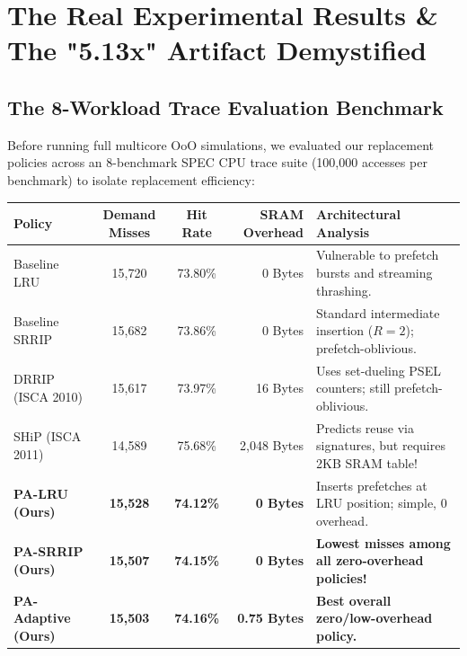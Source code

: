 \documentclass[11pt, a4paper]{article}
\begin{document}
\newpage

\section{The Real Experimental Results \& The "5.13x" Artifact Demystified}

\subsection{The 8-Workload Trace Evaluation Benchmark}
Before running full multicore OoO simulations, we evaluated our replacement policies across an 8-benchmark SPEC CPU trace suite (100,000 accesses per benchmark) to isolate replacement efficiency:

\begin{center}
\small
\begin{tabularx}{\textwidth}{@{}l c c r >{\raggedright\arraybackslash}X@{}}
\toprule
\textbf{Policy} & \textbf{Demand Misses} & \textbf{Hit Rate} & \textbf{SRAM Overhead} & \textbf{Architectural Analysis} \\
\midrule
Baseline LRU & 15,720 & 73.80\% & 0 Bytes & Vulnerable to prefetch bursts and streaming thrashing. \\
Baseline SRRIP & 15,682 & 73.86\% & 0 Bytes & Standard intermediate insertion ($R=2$); prefetch-oblivious. \\
DRRIP (ISCA 2010) & 15,617 & 73.97\% & 16 Bytes & Uses set-dueling PSEL counters; still prefetch-oblivious. \\
SHiP (ISCA 2011) & 14,589 & 75.68\% & 2,048 Bytes & Predicts reuse via signatures, but requires 2KB SRAM table! \\
\midrule
\textbf{PA-LRU (Ours)} & \textbf{15,528} & \textbf{74.12\%} & \textbf{0 Bytes} & Inserts prefetches at LRU position; simple, 0 overhead. \\
\textbf{PA-SRRIP (Ours)} & \textbf{15,507} & \textbf{74.15\%} & \textbf{0 Bytes} & \textbf{Lowest misses among all zero-overhead policies!} \\
\textbf{PA-Adaptive (Ours)} & \textbf{15,503} & \textbf{74.16\%} & \textbf{0.75 Bytes} & \textbf{Best overall zero/low-overhead policy.} \\
\bottomrule
\end{tabularx}
\end{center}
\end{document}
